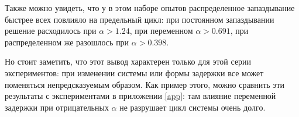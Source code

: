 Также можно увидеть, что у в этом наборе опытов распределенное
запаздывание быстрее всех повлияло на предельный цикл:
при постоянном запаздывании решение расходилось при $\alpha > 1.24$,
при переменном $\alpha > 0.691$, при распределенном же
разошлось при $\alpha > 0.398$.

Но стоит заметить, что этот
вывод характерен только для этой серии экспериментов:
при изменении системы или формы задержки все может поменяться
непредсказуемым образом. Как пример этого, можно сравнить эти результаты
с экспериментами в приложении \ref{app}: там влияние переменной задержки
при отрицательных $\alpha$ не разрушает цикл системы очень долго.
